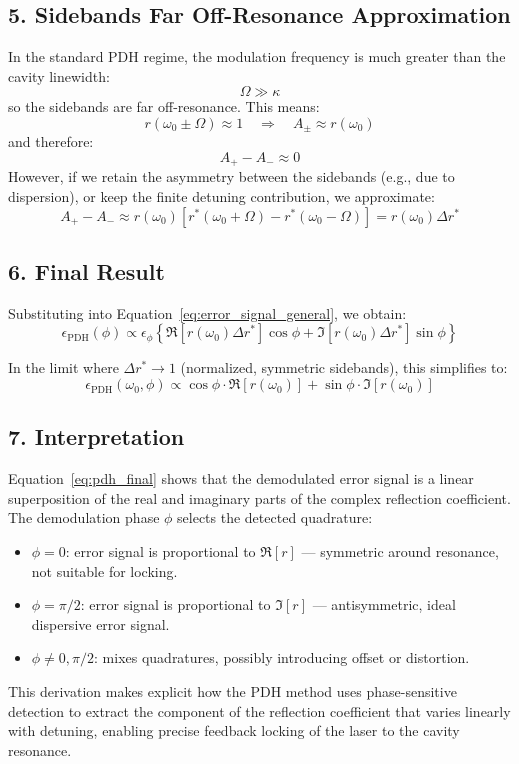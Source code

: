 \subsection*{5. Sidebands Far Off-Resonance Approximation}

In the standard PDH regime, the modulation frequency is much greater than the cavity linewidth:
\[
\Omega \gg \kappa
\]
so the sidebands are far off-resonance. This means:
\[
r(\omega_0 \pm \Omega) \approx 1 \quad \Rightarrow \quad A_\pm \approx r(\omega_0)
\]
and therefore:
\[
A_+ - A_- \approx 0
\]
However, if we retain the asymmetry between the sidebands (e.g., due to dispersion), or keep the finite detuning contribution, we approximate:
\[
A_+ - A_- \approx r(\omega_0) \left[ r^*(\omega_0 + \Omega) - r^*(\omega_0 - \Omega) \right] = r(\omega_0) \Delta r^*
\]

\subsection*{6. Final Result}

Substituting into Equation~\eqref{eq:error_signal_general}, we obtain:
\begin{equation}
\epsilon_{\text{PDH}}(\phi) \propto \epsilon_\phi \left\{
\Re[r(\omega_0) \Delta r^*] \cos\phi + \Im[r(\omega_0) \Delta r^*] \sin\phi
\right\}
\label{eq:error_signal_deltar}
\end{equation}

In the limit where \( \Delta r^* \rightarrow 1 \) (normalized, symmetric sidebands), this simplifies to:
\begin{equation}
\boxed{
\epsilon_{\text{PDH}}(\omega_0, \phi) \propto \cos\phi \cdot \Re[r(\omega_0)] + \sin\phi \cdot \Im[r(\omega_0)]
}
\label{eq:pdh_final}
\end{equation}

\subsection*{7. Interpretation}

Equation~\eqref{eq:pdh_final} shows that the demodulated error signal is a linear superposition of the real and imaginary parts of the complex reflection coefficient. The demodulation phase \( \phi \) selects the detected quadrature:
\begin{itemize}
    \item \( \phi = 0 \): error signal is proportional to \( \Re[r] \) — symmetric around resonance, not suitable for locking.
    \item \( \phi = \pi/2 \): error signal is proportional to \( \Im[r] \) — antisymmetric, ideal dispersive error signal.
    \item \( \phi \ne 0, \pi/2 \): mixes quadratures, possibly introducing offset or distortion.
\end{itemize}

\bigskip

This derivation makes explicit how the PDH method uses phase-sensitive detection to extract the component of the reflection coefficient that varies linearly with detuning, enabling precise feedback locking of the laser to the cavity resonance.

